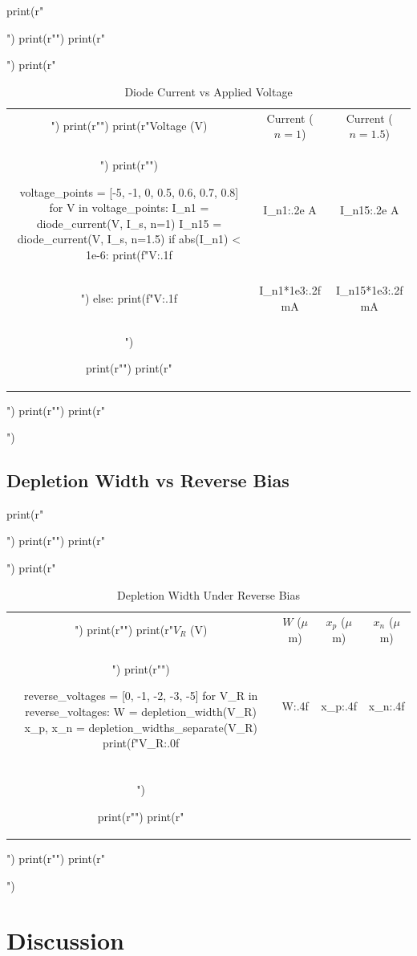 \documentclass[a4paper, 11pt]{article}
\begin{document}
\begin{pycode}
print(r"\begin{table}[htbp]")
print(r"\centering")
print(r"\caption{Diode Current vs Applied Voltage}")
print(r"\begin{tabular}{ccc}")
print(r"\toprule")
print(r"Voltage (V) & Current ($n=1$) & Current ($n=1.5$) \\")
print(r"\midrule")

voltage_points = [-5, -1, 0, 0.5, 0.6, 0.7, 0.8]
for V in voltage_points:
    I_n1 = diode_current(V, I_s, n=1)
    I_n15 = diode_current(V, I_s, n=1.5)
    if abs(I_n1) < 1e-6:
        print(f"{V:.1f} & {I_n1:.2e} A & {I_n15:.2e} A \\\\")
    else:
        print(f"{V:.1f} & {I_n1*1e3:.2f} mA & {I_n15*1e3:.2f} mA \\\\")

print(r"\bottomrule")
print(r"\end{tabular}")
print(r"\label{tab:current}")
print(r"\end{table}")
\end{pycode}

\subsection{Depletion Width vs Reverse Bias}

\begin{pycode}
print(r"\begin{table}[htbp]")
print(r"\centering")
print(r"\caption{Depletion Width Under Reverse Bias}")
print(r"\begin{tabular}{cccc}")
print(r"\toprule")
print(r"$V_R$ (V) & $W$ ($\mu$m) & $x_p$ ($\mu$m) & $x_n$ ($\mu$m) \\")
print(r"\midrule")

reverse_voltages = [0, -1, -2, -3, -5]
for V_R in reverse_voltages:
    W = depletion_width(V_R)
    x_p, x_n = depletion_widths_separate(V_R)
    print(f"{V_R:.0f} & {W:.4f} & {x_p:.4f} & {x_n:.4f} \\\\")

print(r"\bottomrule")
print(r"\end{tabular}")
print(r"\label{tab:depletion}")
print(r"\end{table}")
\end{pycode}

\section{Discussion}
\end{document}
